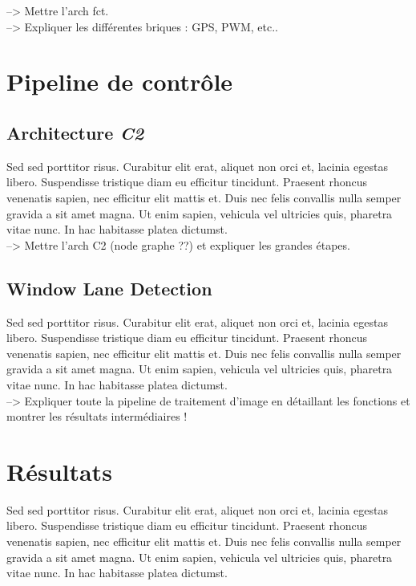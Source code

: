 \documentclass[12pt, openany]{report}
\begin{document}
--> Mettre l'arch fct.\\

--> Expliquer les différentes briques : GPS, PWM, etc..

\section{Pipeline de contrôle}
\subsection{Architecture \textit{C2}}
Sed sed porttitor risus. Curabitur elit erat, aliquet non orci et, lacinia egestas libero. Suspendisse tristique diam eu efficitur tincidunt. Praesent rhoncus venenatis sapien, nec efficitur elit mattis et. Duis nec felis convallis nulla semper gravida a sit amet magna. Ut enim sapien, vehicula vel ultricies quis, pharetra vitae nunc. In hac habitasse platea dictumst.\\

--> Mettre l'arch C2 (node graphe ??) et expliquer les grandes étapes.

\subsection{Window Lane Detection}
Sed sed porttitor risus. Curabitur elit erat, aliquet non orci et, lacinia egestas libero. Suspendisse tristique diam eu efficitur tincidunt. Praesent rhoncus venenatis sapien, nec efficitur elit mattis et. Duis nec felis convallis nulla semper gravida a sit amet magna. Ut enim sapien, vehicula vel ultricies quis, pharetra vitae nunc. In hac habitasse platea dictumst.\\

--> Expliquer toute la pipeline de traitement d'image en détaillant les fonctions et montrer les résultats intermédiaires !

\section{Résultats}
Sed sed porttitor risus. Curabitur elit erat, aliquet non orci et, lacinia egestas libero. Suspendisse tristique diam eu efficitur tincidunt. Praesent rhoncus venenatis sapien, nec efficitur elit mattis et. Duis nec felis convallis nulla semper gravida a sit amet magna. Ut enim sapien, vehicula vel ultricies quis, pharetra vitae nunc. In hac habitasse platea dictumst.\\
\end{document}
